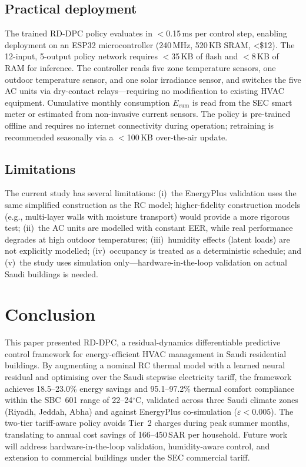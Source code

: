 \documentclass[12pt]{article}
\theoremstyle{plain}
\theoremstyle{definition}
\begin{document}
\subsection{Practical deployment}

The trained RD-DPC policy evaluates in $<$0.15\,ms per control step, enabling deployment on an ESP32 microcontroller (240\,MHz, 520\,KB SRAM, \textless\$12). The 12-input, 5-output policy network requires $<$35\,KB of flash and $<$8\,KB of RAM for inference. The controller reads five zone temperature sensors, one outdoor temperature sensor, and one solar irradiance sensor, and switches the five AC units via dry-contact relays---requiring no modification to existing HVAC equipment. Cumulative monthly consumption $E_{\text{cum}}$ is read from the SEC smart meter or estimated from non-invasive current sensors. The policy is pre-trained offline and requires no internet connectivity during operation; retraining is recommended seasonally via a $<$100\,KB over-the-air update.

\subsection{Limitations}

The current study has several limitations: (i)~the EnergyPlus validation uses the same simplified construction as the RC model; higher-fidelity construction models (e.g., multi-layer walls with moisture transport) would provide a more rigorous test; (ii)~the AC units are modelled with constant EER, while real performance degrades at high outdoor temperatures; (iii)~humidity effects (latent loads) are not explicitly modelled; (iv)~occupancy is treated as a deterministic schedule; and (v)~the study uses simulation only---hardware-in-the-loop validation on actual Saudi buildings is needed.

\section{Conclusion}\label{sec:conclusion}

This paper presented RD-DPC, a residual-dynamics differentiable predictive control framework for energy-efficient HVAC management in Saudi residential buildings. By augmenting a nominal RC thermal model with a learned neural residual and optimising over the Saudi stepwise electricity tariff, the framework achieves 18.5--23.0\% energy savings and 95.1--97.2\% thermal comfort compliance within the SBC~601 range of 22--24$^\circ$C, validated across three Saudi climate zones (Riyadh, Jeddah, Abha) and against EnergyPlus co-simulation ($\varepsilon < 0.005$). The two-tier tariff-aware policy avoids Tier~2 charges during peak summer months, translating to annual cost savings of 166--450\,SAR per household. Future work will address hardware-in-the-loop validation, humidity-aware control, and extension to commercial buildings under the SEC commercial tariff.
\end{document}
